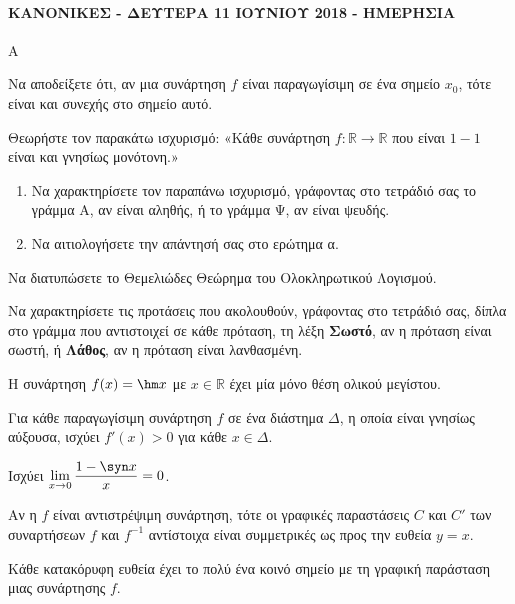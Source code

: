 \paragraph{ΚΑΝΟΝΙΚΕΣ - ΔΕΥΤΕΡΑ 11 ΙΟΥΝΙΟΥ 2018 - ΗΜΕΡΗΣΙΑ}
\begin{thema}{Α}
\begin{erwthma}
    \item Να αποδείξετε ότι, αν μια συνάρτηση $f$ είναι παραγωγίσιμη σε ένα σημείο $x_0$, τότε είναι και συνεχής στο σημείο αυτό. 
    \item Θεωρήστε τον παρακάτω ισχυρισμό: «Κάθε συνάρτηση $f : \mathbb{R} \to \mathbb{R}$ που είναι $1-1$ είναι και γνησίως μονότονη.»
    \begin{enumerate}[label=\alph*.]
        \item Να χαρακτηρίσετε τον παραπάνω ισχυρισμό, γράφοντας στο τετράδιό σας το γράμμα Α, αν είναι αληθής, ή το γράμμα Ψ, αν είναι ψευδής. 
        \item Να αιτιολογήσετε την απάντησή σας στο ερώτημα α. 
    \end{enumerate}
    \item Να διατυπώσετε το Θεμελιώδες Θεώρημα του Ολοκληρωτικού Λογισμού. 
    \item Να χαρακτηρίσετε τις προτάσεις που ακολουθούν, γράφοντας στο τετράδιό σας, δίπλα στο γράμμα που αντιστοιχεί σε κάθε πρόταση, τη λέξη \textbf{Σωστό}, αν η πρόταση είναι σωστή, ή \textbf{Λάθος}, αν η πρόταση είναι λανθασμένη.
    \begin{alist}
        \item Η συνάρτηση $f(x) = \hm x$ με $x \in \mathbb{R}$ έχει μία μόνο θέση ολικού μεγίστου.
        \item Για κάθε παραγωγίσιμη συνάρτηση $f$ σε ένα διάστημα $\Delta$, η οποία είναι γνησίως αύξουσα, ισχύει $f'(x) > 0$ για κάθε $x \in \Delta$.
        \item Ισχύει $\displaystyle\lim_{x \to 0} \dfrac{1 - \syn x}{x} = 0$.
        \item Αν η $f$ είναι αντιστρέψιμη συνάρτηση, τότε οι γραφικές παραστάσεις $C$ και $C'$ των συναρτήσεων $f$ και $f^{-1}$ αντίστοιχα είναι συμμετρικές ως προς την ευθεία $y = x$.
        \item Κάθε κατακόρυφη ευθεία έχει το πολύ ένα κοινό σημείο με τη γραφική παράσταση μιας συνάρτησης $f$.
    \end{alist} 
\end{erwthma}
\end{thema}
